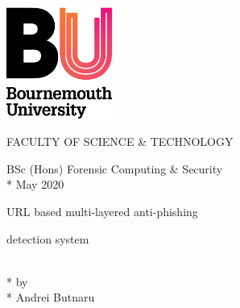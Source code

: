 
\begin{titlepage}
    \centering
{}

\vspace*{1em}\hspace*{-1cm}\includegraphics[width=3.5cm, left]{figures/unilogo.png}

\begin{center}
\huge{FACULTY OF SCIENCE \& TECHNOLOGY}
\\
\normalsize\vspace{6em}

\LARGE{
BSc (Hons) Forensic Computing \& Security
}
\\*
\LARGE{
May 2020
}

\normalsize\vspace{6em}

\LARGE{
URL based multi-layered anti-phishing 

detection system
}
\\*
\normalsize\vspace{4em}
\LARGE{by}
\\*
\normalsize\vspace{4em}
\LARGE{
Andrei Butnaru
}

\end{center}
\end{titlepage}
\cleardoublepage



